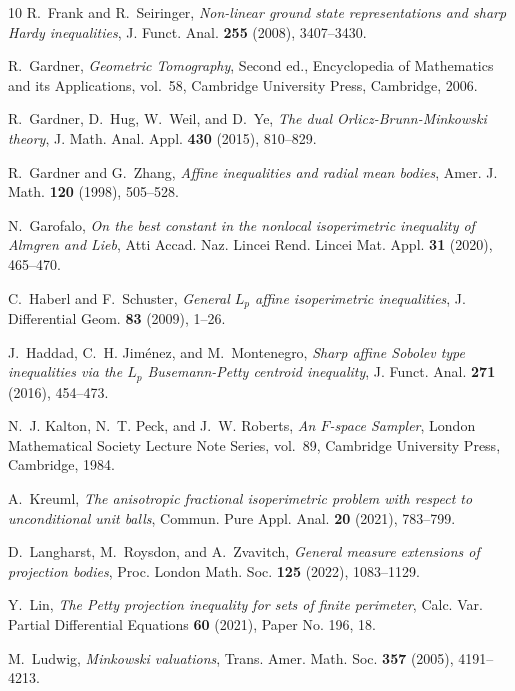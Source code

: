 \documentclass{amsart}
\begin{document}
\begin{thebibliography}{10}
R.~Frank and R.~Seiringer, {\em Non-linear ground state representations
and sharp Hardy inequalities}, J. Funct. Anal. \textbf{255} (2008), 3407--3430.

R.~Gardner, {\em Geometric Tomography}, Second ed., Encyclopedia of Mathematics
and its Applications, vol.~58, Cambridge University Press, Cambridge, 2006.

R.~Gardner, D.~Hug, W.~Weil, and D.~Ye, {\em The dual Orlicz-Brunn-Minkowski
theory}, J. Math. Anal. Appl. \textbf{430} (2015), 810--829.

R.~Gardner and G.~Zhang, {\em Affine inequalities and radial mean bodies},
Amer. J. Math. \textbf{120} (1998), 505--528.

N.~Garofalo, {\em On the best constant in the nonlocal isoperimetric inequality
of Almgren and Lieb}, Atti Accad. Naz. Lincei Rend. Lincei Mat. Appl.
\textbf{31} (2020), 465--470.

C.~Haberl and F.~Schuster, {\em General ${L}_{p}$ affine isoperimetric
inequalities}, J. Differential Geom. \textbf{83} (2009), 1--26.

J.~Haddad, C.~H. Jim\'{e}nez, and M.~Montenegro, {\em Sharp affine Sobolev
type inequalities via the $L_{p}$ Busemann-Petty centroid inequality},
J. Funct. Anal. \textbf{271} (2016), 454--473.

N.~J. Kalton, N.~T. Peck, and J.~W. Roberts, {\em An $F$-space Sampler},
London Mathematical Society Lecture Note Series, vol.~89, Cambridge University
Press, Cambridge, 1984.

A.~Kreuml, {\em The anisotropic fractional isoperimetric problem with respect
to unconditional unit balls}, Commun. Pure Appl. Anal. \textbf{20} (2021),
783--799.

D.~Langharst, M.~Roysdon, and A.~Zvavitch, {\em General measure extensions
of projection bodies}, Proc. London Math. Soc. \textbf{125} (2022), 1083--1129.

Y.~Lin, {\em The Petty projection inequality for sets of finite perimeter},
Calc. Var. Partial Differential Equations \textbf{60} (2021), Paper No. 196,
18.

M.~Ludwig, {\em Minkowski valuations}, Trans. Amer. Math. Soc. \textbf{357}
(2005), 4191--4213.


\end{thebibliography}
\end{document}
